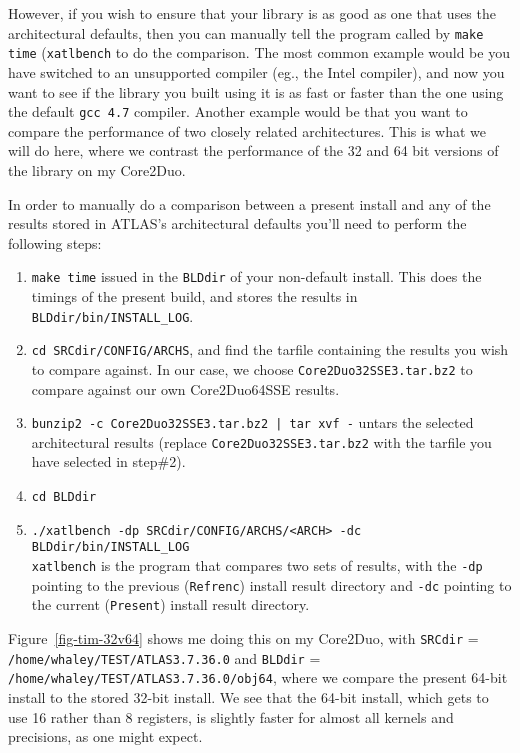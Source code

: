 \documentclass[11pt]{article}
\begin{document}
However, if you wish to ensure that your library is as good as one that
uses the architectural defaults, then you can manually tell the program
called by {\tt make time} ({\tt xatlbench} to do the comparison.  The most
common example would
be you have switched to an unsupported compiler (eg., the Intel compiler),
and now you want to see if the library you built using it is as fast or faster
than the one using the default {\tt gcc 4.7} compiler.  Another example would
be that you want to compare the performance of two closely related
architectures.  This is what we will do here, where we contrast the performance
of the 32 and 64 bit versions of the library on my Core2Duo.

In order to manually do a comparison between a present install and any of
the results stored in ATLAS's architectural defaults you'll need to
perform the following steps:
\begin{enumerate}
\item  {\tt make time} issued in the {\tt BLDdir} of your non-default install.
       This does the timings of the present build, and stores the results
       in {\tt BLDdir/bin/INSTALL\_LOG}.
\item {\tt cd SRCdir/CONFIG/ARCHS}, and find the tarfile containing the
      results you wish to compare against.  In our case, we choose
      {\tt Core2Duo32SSE3.tar.bz2} to compare against our own Core2Duo64SSE
      results.
\item {\tt bunzip2 -c Core2Duo32SSE3.tar.bz2 | tar xvf -} untars the
      selected architectural results (replace {\tt Core2Duo32SSE3.tar.bz2} 
      with the tarfile you have selected in step\#2).
\item {\tt cd BLDdir}
\item \verb|./xatlbench -dp SRCdir/CONFIG/ARCHS/<ARCH> -dc BLDdir/bin/INSTALL_LOG|  \\
    {\tt xatlbench} is the program that compares two sets of results, with
    the {\tt -dp} pointing to the previous ({\tt Refrenc}) install result
    directory and {\tt -dc} pointing to the current ({\tt Present})
    install result directory.
\end{enumerate}

Figure~\ref{fig-tim-32v64} shows me doing this on my Core2Duo, with 
{\tt SRCdir} = {\tt /home/whaley/TEST/ATLAS3.7.36.0} and
{\tt BLDdir} = {\tt /home/whaley/TEST/ATLAS3.7.36.0/obj64}, where we compare
the present 64-bit install to the stored 32-bit install.
We see that the 64-bit install, which gets to use 16 rather than 8 registers,
is slightly faster for almost all kernels and precisions, as one might expect.
\end{document}
